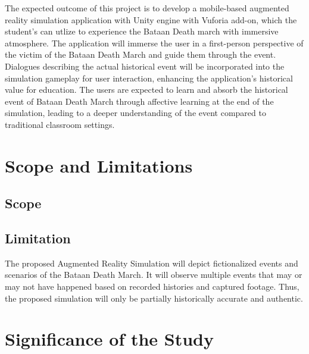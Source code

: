 The expected outcome of this project is to develop a mobile-based augmented reality simulation application with Unity engine with Vuforia add-on, which the student's can utlize to experience the Bataan Death march with immersive atmosphere. The application will immerse the user in a first-person perspective of the victim of the Bataan Death March and guide them through the event. Dialogues describing the actual historical event will be incorporated into the simulation gameplay for user interaction, enhancing the application's historical value for education. The users are expected to learn and absorb the historical event of Bataan Death March through affective learning at the end of the simulation, leading to a deeper understanding of the event compared to traditional classroom settings.
 
\section{Scope and Limitations}
\subsection*{Scope}

\subsection*{Limitation}
The proposed Augmented Reality Simulation will depict fictionalized events and scenarios of the Bataan Death March. It will observe multiple events that may or may not have happened based on recorded histories and captured footage. Thus, the proposed simulation will only be partially historically accurate and authentic.

\section{Significance of the Study}
